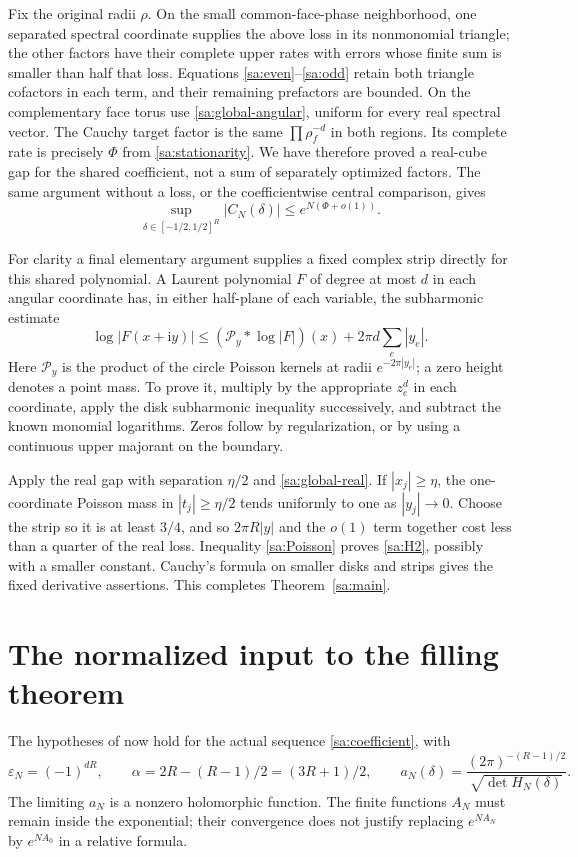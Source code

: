 \documentclass[11pt]{article}
\numberwithin{equation}{section}
\theoremstyle{definition}\newtheorem{definition}[theorem]{Definition}
\theoremstyle{remark}\newtheorem{remark}[theorem]{Remark}
\newcommand{\ii}{\mathrm i}
\begin{document}
Fix the original radii $\rho$. On the small common-face-phase
neighborhood, one separated spectral coordinate supplies the above
loss in its nonmonomial triangle; the other factors have their
complete upper rates with errors whose finite sum is smaller than
half that loss. Equations \eqref{sa:even}--\eqref{sa:odd} retain both
triangle cofactors in each term, and their remaining prefactors are
bounded. On the complementary face torus use
\eqref{sa:global-angular}, uniform for every real spectral vector.
The Cauchy target factor is the same $\prod\rho_f^{-d}$ in both
regions. Its complete rate is precisely $\Phi$ from
\eqref{sa:stationarity}. We have therefore proved a real-cube gap
for the shared coefficient, not a sum of separately optimized factors.
The same argument without a loss, or the coefficientwise central
comparison, gives
\begin{equation}\label{sa:global-real}
 \sup_{\delta\in[-1/2,1/2]^R}|C_N(\delta)|
                                      \le e^{N(\Phi+o(1))}.
\end{equation}

For clarity a final elementary argument supplies a fixed complex strip
directly for this shared polynomial. A Laurent polynomial $F$ of
degree at most $d$ in each angular coordinate has, in either
half-plane of each variable, the subharmonic estimate
\begin{equation}\label{sa:Poisson}
 \log|F(x+\ii y)|\le
 (\mathcal P_y*\log|F|)(x)+2\pi d\sum_e|y_e|.
\end{equation}
Here $\mathcal P_y$ is the product of the circle Poisson kernels
at radii $e^{-2\pi|y_e|}$; a zero height denotes a point mass.
To prove it, multiply by the appropriate $z_e^d$ in each coordinate,
apply the disk subharmonic inequality successively, and subtract the
known monomial logarithms. Zeros follow by regularization, or by
using a continuous upper majorant on the boundary.

Apply the real gap with separation $\eta/2$ and
\eqref{sa:global-real}. If $|x_j|\ge\eta$, the one-coordinate
Poisson mass in $|t_j|\ge\eta/2$ tends uniformly to one as
$|y_j|\to0$. Choose the strip so it is at least $3/4$, and so
$2\pi R|y|$ and the $o(1)$ term together cost less than a quarter
of the real loss. Inequality \eqref{sa:Poisson} proves
\eqref{sa:H2}, possibly with a smaller constant. Cauchy's formula on
smaller disks and strips gives the fixed derivative assertions.
This completes Theorem~\ref{sa:main}.

\section{The normalized input to the filling theorem}
The hypotheses of \cite[Theorem 1.1]{Oscillatory} now hold for the
actual sequence \eqref{sa:coefficient}, with
\begin{equation}\label{sa:export}
 \varepsilon_N=(-1)^{dR},\qquad
 \alpha=2R-(R-1)/2=(3R+1)/2,\qquad
 a_N(\delta)=\frac{(2\pi)^{-(R-1)/2}}{\sqrt{\det H_N(\delta)}}.
\end{equation}
The limiting $a_N$ is a nonzero holomorphic function. The finite
functions $A_N$ must remain inside the exponential; their convergence
does not justify replacing $e^{NA_N}$ by $e^{NA_0}$ in a relative formula.
\end{document}

